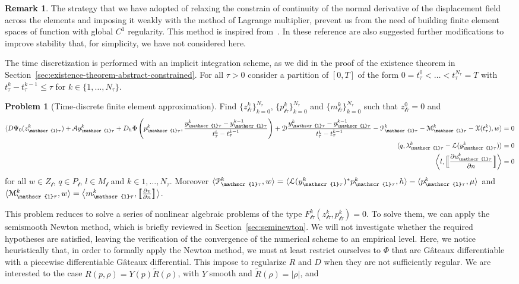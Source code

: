 \documentclass[a4paper,10pt,oneside]{amsbook}
\numberwithin{section}{chapter}
\numberwithin{equation}{chapter}
\theoremstyle{definition}
\newtheorem{rmk}[prop]{Remark}
\newtheorem{prb}[prop]{Problem}
\DeclarePairedDelimiter{\dual}{\langle}{\rangle}
\newcommand{\dind}[2]{\frac{\partial #1}{\partial #2}}
\begin{document}
\begin{rmk}
The strategy that we have adopted of relaxing the constrain of continuity of the normal derivative of the displacement field across the elements and imposing it weakly with the method of Lagrange multiplier, prevent us from the need of building finite element spaces of function with global $C^1$ regularity. This method is inspired from~\cite{kim2009numerical,engel2002continuous}. In these reference are also suggested further modifications to improve stability that, for simplicity, we have not considered here.
\end{rmk}
The time discretization is performed with an implicit integration scheme, as we did in the proof of the existence theorem in Section~\ref{sec:existence-theorem-abstract-constrained}. For all $\tau>0$ consider a partition of $[0,T]$ of the form $0=t^0_\tau<\dots<t^{N_\tau}_\tau=T$ with $t_\tau^k-t_\tau^{k-1}\le\tau$ for $k\in\{1,\dots,N_\tau\}$.
\begin{prb}[Time-discrete finite element approximation]
Find $\{z_{\mathscr{l}\tau}^k\}_{k=0}^{N_\tau}$, $\{p_{\mathscr{l}\tau}^k\}_{k=0}^{N_\tau}$ and $\{m_{\mathscr{l}\tau}^k\}_{k=0}^{N_\tau}$ such that $z_{\mathscr{l}\tau}^0=0$ and
\begin{align}
\dual{D\Psi_0(z_{\mathscr{l}\tau}^k)+\mathcal{A}y_{\mathscr{l}\tau}^k+D_h\Phi\left(p_{\mathscr{l}\tau}^k,\frac{y_{\mathscr{l}\tau}^k-y_{\mathscr{l}\tau}^{k-1}}{t_\tau^k-t_\tau^{k-1}}\right)+\mathcal{D}\frac{y_{\mathscr{l}\tau}^k-y_{\mathscr{l}\tau}^{k-1}}{t_\tau^k-t_\tau^{k-1}}-\mathcal{P}_{\mathscr{l}\tau}^k-\mathcal{M}_{\mathscr{l}\tau}^k-\mathcal{X}(t_\tau^k),w}&=0 \\
\dual{q,\lambda_{\mathscr{l}\tau}^k-\mathcal{L}(y_{\mathscr{l}\tau}^k)}&=0 \\
\left\langle l,\Big[\!\!\Big[\dind{u_{\mathscr{l}\tau}^k}{n}\Big]\!\!\Big]\right\rangle&=0
\end{align}
for all $w\in Z_\mathscr{l}$, $q\in P_\mathscr{l}$, $l\in M_\mathscr{l}$ and $k\in{1,\dots,N_\tau}$. Moreover $\dual{\mathcal{P}_{\mathscr{l}\tau}^k,w}=\dual{\mathcal{L}(y_{\mathscr{l}\tau}^k)^*p_{\mathscr{l}\tau}^k,h}-\dual{p_{\mathscr{l}\tau}^k,\mu}$ and $\dual{\mathcal{M}_{\mathscr{l}\tau}^k,w}=\left\langle m_{\mathscr{l}\tau}^k,\big[\!\!\big[\dind{v}{n}\big]\!\!\big]\right\rangle$.
\end{prb}
This problem reduces to solve a series of nonlinear algebraic problems of the type $F_{\mathscr{l}\tau}^k(z_{\mathscr{l}\tau}^k,p_{\mathscr{l}\tau}^k)=0$. To solve them, we can apply the semismooth Newton method, which is briefly reviewed in Section~\ref{sec:seminewton}. We will not investigate whether the required hypotheses are satisfied, leaving the verification of the convergence of the numerical scheme to an empirical level. Here, we notice heuristically that, in order to formally apply the Newton method, we must at least restrict ourselves to $\Phi$ that are G\^ateaux differentiable with a piecewise differentiable G\^ateaux differential. This impose to regularize $R$ and $D$ when they are not sufficiently regular. We are interested to the case $R(p,\rho)=Y(p)\tilde R(\rho)$, with $Y$ smooth and $\tilde R(\rho)=|\rho|$, and
\end{document}
